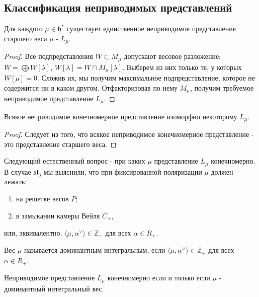 \documentclass[a4article]{article}
\begin{document}
\subsection*{Классификация неприводимых представлений}
\begin{theorem}
    Для каждого $\mu \in \mathfrak{h}^*$ существует единственное неприводимое представление старшего веса $\mu$ - $L_{\mu}$. 
\end{theorem}
\begin{proof}
    Все подпредставления $W \subset M_{\mu}$ допускают весовое разложение: $W = \bigoplus W[\lambda]$, $W[\lambda] = W \cap M_{\mu}[\lambda]$. Выберем из них только те, у которых $W[\mu]=0$. Сложив их, мы получим максимальное подпредставление, которое не содержится ни в каком другом. Отфакторизовав по нему $M_{\mu}$, получим требуемое неприводимое представление $L_{\mu}$. 
\end{proof}
\begin{corollary}
    Всякое неприводимое конечномерное представление изоморфно некоторому $L_{\mu}$.
\end{corollary}
\begin{proof}
    Следует из того, что всякое неприводимое конечномерное представление - это представление старшего веса.
\end{proof}

Следующий естественный вопрос - при каких $\mu$ представление $L_{\mu}$ конечномерно. В случае $\mathfrak{sl}_3$ мы выяснили, что при фиксированной поляризации $\mu$ должен лежать: 
\begin{enumerate}
    \item на решетке весов $P$;
    \item в замыкании камеры Вейля $\overline{C}_+$,
\end{enumerate}
или, эквивалентно, $\langle \mu, \alpha^{\vee} \rangle \in \mathbb{Z}_+$ для всех $\alpha \in R_+$.
\begin{definition}
    Вес $\mu$ называется доминантным интегральным, если $\langle \mu, \alpha^{\vee} \rangle \in \mathbb{Z}_+$ для всех $\alpha \in R_+$.
\end{definition}
\begin{theorem}
    Неприводимое представление $L_{\mu}$ конечномерно если и только если $\mu$ - доминантный интегральный вес.
\end{theorem}
\end{document}
